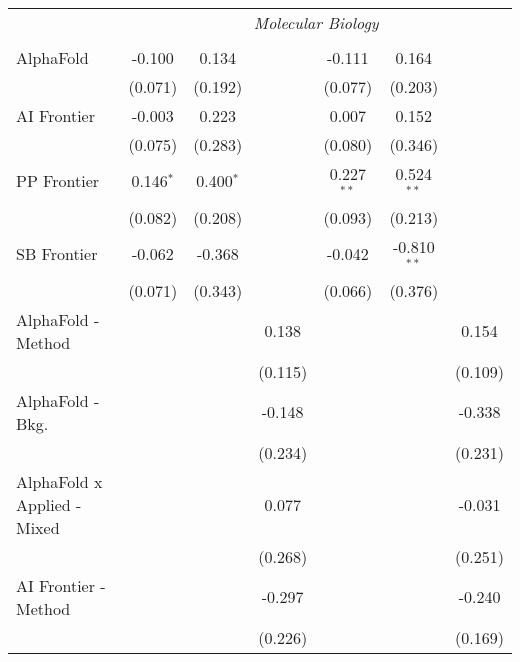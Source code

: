 \begin{tabular}{lcccccc}
 & \multicolumn{6}{c}{\textit{Molecular Biology}} \\ \\
   AlphaFold                     & -0.100      & 0.134       &             & -0.111       & 0.164         &   \\   
                                 & (0.071)     & (0.192)     &             & (0.077)      & (0.203)       &   \\   
   AI Frontier                   & -0.003      & 0.223       &             & 0.007        & 0.152         &   \\   
                                 & (0.075)     & (0.283)     &             & (0.080)      & (0.346)       &   \\   
   PP Frontier                   & 0.146$^{*}$ & 0.400$^{*}$ &             & 0.227$^{**}$ & 0.524$^{**}$  &   \\   
                                 & (0.082)     & (0.208)     &             & (0.093)      & (0.213)       &   \\   
   SB Frontier                   & -0.062      & -0.368      &             & -0.042       & -0.810$^{**}$ &   \\   
                                 & (0.071)     & (0.343)     &             & (0.066)      & (0.376)       &   \\   
   AlphaFold - Method            &             &             & 0.138       &              &               & 0.154\\   
                                 &             &             & (0.115)     &              &               & (0.109)\\   
   AlphaFold - Bkg.              &             &             & -0.148      &              &               & -0.338\\   
                                 &             &             & (0.234)     &              &               & (0.231)\\   
   AlphaFold x Applied - Mixed   &             &             & 0.077       &              &               & -0.031\\   
                                 &             &             & (0.268)     &              &               & (0.251)\\   
   AI Frontier - Method          &             &             & -0.297      &              &               & -0.240\\   
                                 &             &             & (0.226)     &              &               & (0.169)\\   

\end{tabular}
